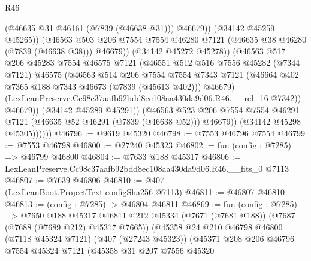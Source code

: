 \begin{lexlean}{R46}
\begin{coremodule}
                              (@46635 @31 @46161 (@7839 (@46638 @31)))
                              @46679))
                          (@34142 @45259 @45265))
                        (@46563
                          @503
                          @206
                          @7554
                          @7554
                          @46280
                          @7121
                          (@46635 @38 @46280 (@7839 (@46638 @38)))
                          @46679))
                      (@34142 @45272 @45278))
                    (@46563
                      @517
                      @206
                      @45283
                      @7554
                      @46575
                      @7121
                      (@46551
                        @512
                        @516
                        @7556
                        @45282
                        (@7344 @7121)
                        @46575
                        (@46563
                          @514
                          @206
                          @7554
                          @7554
                          @7343
                          @7121
                          (@46664 @402 @7365 @188 @7343 @46673 (@7839 (@45613 @402)))
                          @46679)
                        (LexLeanPreserve.Cc98c37aafb92bdd8ec108aa430da9d06.R46.__rel_16 @7342))
                      @46679))
                  (@34142 @45289 @45291))
                (@46563
                  @523
                  @206
                  @7554
                  @7554
                  @46291
                  @7121
                  (@46635 @52 @46291 (@7839 (@46638 @52)))
                  @46679))
              (@34142 @45298 @45305))))))
@46796 := @9619 @45320
@46798 := @7553 @46796 @7554
@46799 := @7553 @46798
@46800 := @27240 @45323
@46802 := fun (config : @7285) => @46799 @46800
@46804 := @7633 @188 @45317
@46806 := LexLeanPreserve.Cc98c37aafb92bdd8ec108aa430da9d06.R46.__fits_0 @7113
@46807 := @7639 @46806
@46810 := @407 (LexLeanBoot.ProjectText.configSha256 @7113)
@46811 := @46807 @46810
@46813 := (config : @7285) -> @46804 @46811
@46869 := fun (config : @7285) =>
  @7650
    @188
    @45317
    @46811
    @212
    @45334
    (@7671 (@7681 @188))
    (@7687 (@7688 (@7689 @212) @45317 @7665))
    (@45358
      @24
      @210
      @46798
      @46800
      (@7118 @45324 @7121)
      (@407 (@27243 @45323))
      (@45371
        @208
        @206
        @46796
        @7554
        @45324
        @7121
        (@45358
          @31
          @207
          @7556
          @45320

\end{coremodule}
\end{lexlean}
